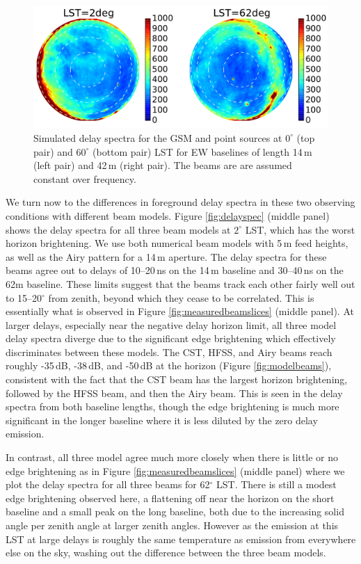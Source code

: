 \documentclass[preprint]{aastex}
\begin{document}
\begin{figure}[h]
\centering
\includegraphics[width=6in]{gsm_kelvin_LST_2deg_and_62deg.pdf}
\caption{Simulated delay spectra for the GSM and point sources at $0^\circ$ (top pair) and $60^\circ$ (bottom pair) LST for EW baselines of length 14\,m (left pair) and 42\,m (right pair). The beams are are assumed constant over frequency.}
\label{fig:gsmplots}
\end{figure}

We turn now to the differences in foreground delay spectra in these two observing conditions with different beam models. Figure \ref{fig:delayspec} (middle panel) shows the delay spectra for all three beam models at $2^\circ$ LST, which has the worst horizon brightening. We use both numerical beam models with 5\,m feed heights, as well as the Airy pattern for a 14\,m aperture. The delay spectra for these beams agree out to delays of 10--20\,ns on the 14\,m baseline and 30--40\,ns on the 62m baseline. These limits suggest that the beams track each other fairly well out to 15--20$^\circ$ from zenith, beyond which they cease to be correlated. This is essentially what is observed in Figure \ref{fig:measuredbeamslices} (middle panel). At larger delays, especially near the negative delay horizon limit, all three model delay spectra diverge due to the significant edge brightening which effectively discriminates between these models. The CST, HFSS, and Airy beams reach roughly -35\,dB, -38\,dB, and -50\,dB at the horizon (Figure \ref{fig:modelbeams}), consistent with the fact that the CST beam has the largest horizon brightening, followed by the HFSS beam, and then the Airy beam. This is seen in the delay spectra from both baseline lengths, though the edge brightening is much more significant in the longer baseline where it is less diluted by the zero delay emission.  

In contrast, all three model agree much more closely when there is little or no edge brightening as in Figure \ref{fig:measuredbeamslices} (middle panel) where we plot the delay spectra for all three beams for 62$^\circ$ LST. There is still a modest edge brightening observed here, a flattening off near the horizon on the short baseline and a small peak on the long baseline, both due to the increasing solid angle per zenith angle at larger zenith angles. However as the emission at this LST at large delays is roughly the same temperature as emission from everywhere else on the sky, washing out the difference between the three beam models.
\end{document}
